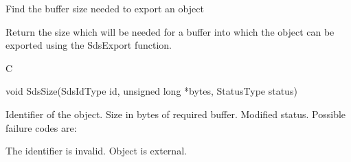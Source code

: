 \begin{manroutinedescription}
      Find the buffer size needed to export an object

      Return the size which will be needed for a buffer into which the object
      can be exported using the SdsExport function.
 
      C

      void SdsSize(SdsIdType id, unsigned long *bytes, StatusType {\mantt{*}} {%
} status)
 
\begin{manparametertable}
  Identifier of the object.
 Size in bytes of %
required buffer.
 Modified status. Possible %
failure codes are:
\end{manparametertable}
\begin{mantwocolumntable}
The identifier is invalid.
Object is external.
\end{mantwocolumntable}
\end{manroutinedescription}
